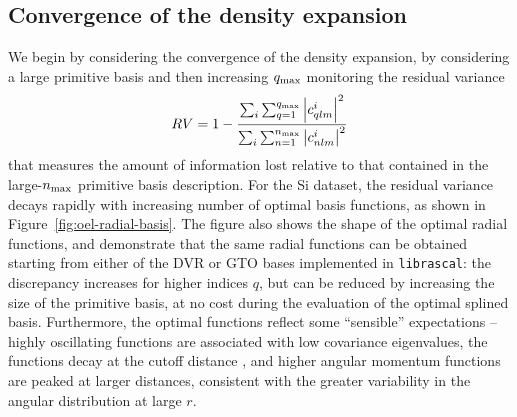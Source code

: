 \subsection{Convergence of the density expansion}

We begin by considering the convergence of the density expansion, by considering a large primitive basis and then increasing $q_\mathrm{max}$ monitoring the residual variance
\begin{equation}
  RV = 1-\frac{\sum_i\sum_{q=1}^{q_\mathrm{max}} \left|c^i_{qlm} \right|^2}{\sum_i\sum_{n=1}^{n_\mathrm{max}} \left|c^i_{nlm}\right|^2}
\end{equation}
that measures the amount of information lost relative to that contained in the large-$n_\mathrm{max}$ primitive basis description. 
For the Si dataset, the residual variance decays rapidly with increasing number of optimal basis functions, as shown in Figure~\ref{fig:oel-radial-basis}.
The figure also shows the shape of the optimal radial functions, and demonstrate that the same radial functions can be obtained starting from either of the DVR or GTO bases implemented in \texttt{librascal}: the discrepancy increases for higher indices $q$, but can be reduced by increasing the size of the primitive basis, at no cost during the evaluation of the optimal splined basis. Furthermore, the optimal functions reflect some ``sensible'' expectations -- highly oscillating functions are associated with low covariance eigenvalues, the functions decay at the cutoff distance 
, and higher angular momentum functions are peaked at larger distances, consistent with the greater variability in the angular distribution at large $r$.



